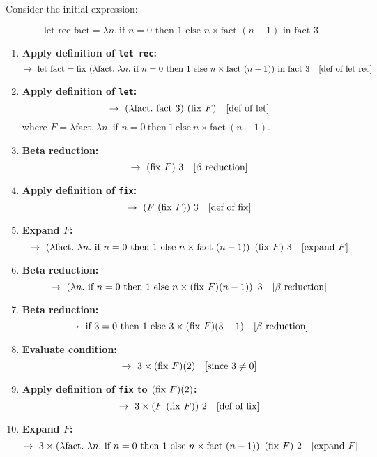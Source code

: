 \documentclass{article}
\theoremstyle{theorem}
\theoremstyle{definition}
\theoremstyle{remark}
\begin{document}
Consider the initial expression:

\[
\text{let rec } \text{fact} = \lambda n.\ \text{if } n = 0 \text{ then } 1 \text{ else } n \times \text{fact } (n - 1) \text{ in } \text{fact } 3
\]

\begin{enumerate}
    \item \textbf{Apply definition of \texttt{let rec}:}
    \[    \rightarrow\ \text{let } \text{fact} = \fix\ (\lambda \text{fact}.\ \lambda n.\ \text{if } n = 0\ \text{then}\ 1\ \text{else}\ n \times \text{fact}\ (n - 1))\ \text{in}\ \text{fact}\ 3 \quad [\text{def of let rec}]
    \]
    \item \textbf{Apply definition of \texttt{let}:}
    \[    \rightarrow\ (\lambda \text{fact}.\ \text{fact}\ 3)\ (\fix\ F) \quad [\text{def of let}]
    \]
    where \( F = \lambda \text{fact}.\ \lambda n.\ \text{if } n = 0\ \text{then}\ 1\ \text{else}\ n \times \text{fact}\ (n - 1) \).
    \item \textbf{Beta reduction:}
    \[    \rightarrow\ (\fix\ F)\ 3 \quad [\beta\ \text{reduction}]
    \]
    \item \textbf{Apply definition of \texttt{fix}:}
    \[    \rightarrow\ (F\ (\mathrm{fix}\ F))\ 3 \quad [\text{def of } \mathrm{fix}]
    \]
    \item \textbf{Expand \( F \):}
    \[    \rightarrow\ \left( \lambda \text{fact}.\ \lambda n.\ \text{if } n = 0\ \text{then}\ 1\ \text{else}\ n \times \text{fact}\ (n - 1) \right)\ (\fix\ F)\ 3 \quad [\text{expand } F]
    \]
    \item \textbf{Beta reduction:}
    \[    \rightarrow\ \left( \lambda n.\ \text{if } n = 0\ \text{then}\ 1\ \text{else}\ n \times (\fix\ F)(n - 1) \right)\ 3 \quad [\beta\ \text{reduction}]
    \]
    \item \textbf{Beta reduction:}
    \[    \rightarrow\ \text{if } 3 = 0\ \text{then}\ 1\ \text{else}\ 3 \times (\fix\ F)(3 - 1) \quad [\beta\ \text{reduction}]
    \]
    \item \textbf{Evaluate condition:}
    \[    \rightarrow\ 3 \times (\mathrm{fix}\ F)(2) \quad [\text{since } 3 \ne 0]
    \]
    \item \textbf{Apply definition of \texttt{fix} to \((\mathrm{fix}\ F)(2)\):}
    \[    \rightarrow\ 3 \times (F\ (\mathrm{fix}\ F))\ 2 \quad [\text{def of } \mathrm{fix}]
    \]
    \item \textbf{Expand \( F \):}
    \[    \rightarrow\ 3 \times \left( \lambda \text{fact}.\ \lambda n.\ \text{if } n = 0\ \text{then}\ 1\ \text{else}\ n \times \text{fact}\ (n - 1) \right)\ (\fix\ F)\ 2 \quad [\text{expand } F]
\]
\end{enumerate}
\end{document}
